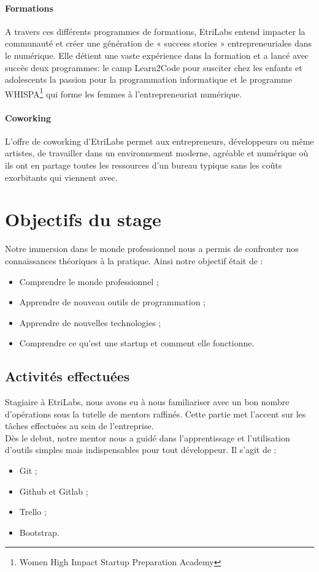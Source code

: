 \paragraph{Formations}
$ $\\A travers ces différents programmes de formations, EtriLabs entend impacter la communauté et créer une génération de « success stories » entrepreneuriales dans le numérique. Elle détient une vaste expérience dans la formation et a lancé avec succès deux programmes: le camp Learn2Code pour susciter chez les enfants et adolescents la passion pour la programmation informatique et le programme WHISPA\footnote{Women High Impact Startup Preparation Academy} qui forme les femmes à l’entrepreneuriat numérique.

\paragraph{Coworking} 
$ $\\L’offre de coworking d'EtriLabs permet aux entrepreneurs, développeurs ou même artistes, de travailler dans un environnement moderne, agréable et numérique où ils ont en partage toutes les ressources d’un bureau typique sans les coûts exorbitants qui viennent avec.

\section{Objectifs du stage}
Notre immersion dans le monde professionnel nous a permis de confronter nos connaissances théoriques à la pratique. Ainsi notre objectif était de :
\begin{itemize}
\item[\textbullet] Comprendre le monde professionnel ;
\item[\textbullet] Apprendre de nouveau outils de programmation ;
\item[\textbullet] Apprendre de nouvelles technologies ;
\item[\textbullet] Comprendre ce qu’est une startup et comment elle fonctionne.
\end{itemize}

\subsection{Activités effectuées}
Stagiaire à EtriLabs, nous avons eu à nous familiariser avec un bon nombre d’opérations sous la tutelle de mentors raffinés. Cette partie met l’accent sur les tâches effectuées au sein de l’entreprise.
\\Dès le debut, notre mentor nous a guidé dans l’apprentissage et l’utilisation d’outils simples mais indispensables pour tout développeur. Il s’agit de :
\begin{itemize}
\item[\textbullet] Git ;
\item[\textbullet] Github et Gitlab ;
\item[\textbullet] Trello ;
\item[\textbullet] Bootstrap.
\end{itemize}


